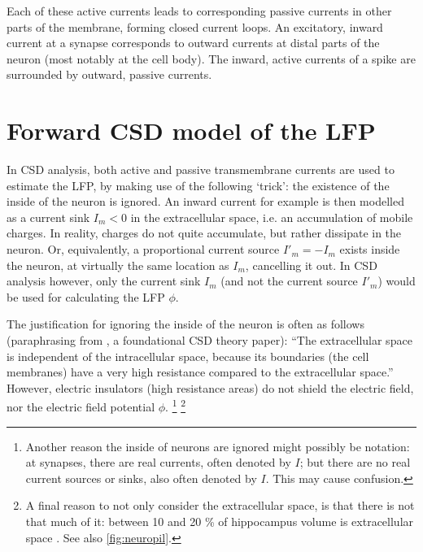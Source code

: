 
Each of these active currents leads to corresponding passive currents in other parts of the membrane, forming closed current loops. An excitatory, inward current at a synapse corresponds to outward currents at distal parts of the neuron (most notably at the cell body). The inward, active currents of a spike are surrounded by outward, passive currents.



\section{Forward CSD model of the LFP}
\label{sec:forward-CSD}

In CSD analysis, both active and passive transmembrane currents are used to estimate the LFP, by making use of the following `trick': the existence of the inside of the neuron is ignored. An inward current for example is then modelled as a current sink $I_m < 0$ in the extracellular space, i.e. an accumulation of mobile charges. In reality, charges do not quite accumulate, but rather dissipate in the neuron. Or, equivalently, a proportional current source $I'_m = -I_m$ exists inside the neuron, at virtually the same location as $I_m$, cancelling it out. In CSD analysis however, only the current sink $I_m$ (and not the current source $I'_m$) would be used for calculating the LFP $\phi$.

The justification for ignoring the inside of the neuron is often as follows (paraphrasing from \cite{Mitzdorf1985}, a foundational CSD theory paper): ``The extracellular space is independent of the intracellular space, because its boundaries (the cell membranes) have a very high resistance compared to the extracellular space.'' However, electric insulators (high resistance areas) do not shield the electric field, nor the electric field potential $\phi$.
%
\footnote{Another reason the inside of neurons are ignored might possibly be notation: at synapses, there are real currents, often denoted by $I$; but there are no real current sources or sinks, also often denoted by $I$. This may cause confusion.}
\footnote{A final reason to not only consider the extracellular space, is that there is not that much of it: between 10 and 20 \% of hippocampus volume is extracellular space \cite{Sykova1997a}. See also \cref{fig:neuropil}.}

